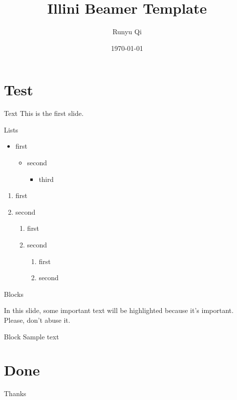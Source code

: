 \documentclass{beamer}
\title{Illini Beamer Template}
\author{Runyu Qi}
\institute{University of Illinois at Urbana-Champaign}
\date{\today}
\begin{document}
\begin{frame}
    \titlepage
\end{frame}

\begin{frame}
    \tableofcontents
\end{frame}

\section{Test}

\begin{frame}{Text}
    This is the first slide.
\end{frame}

\begin{frame}{Lists}
    \begin{itemize}
        \item first
        \begin{itemize}
            \item second
            \begin{itemize}
                \item third
            \end{itemize} 
        \end{itemize}
    \end{itemize}

    \begin{enumerate}
        \item first
        \item second
        \begin{enumerate}
            \item first
            \item second
            \begin{enumerate}
                \item first
                \item second
            \end{enumerate}
        \end{enumerate}
            
    \end{enumerate}
\end{frame}

\begin{frame}{Blocks}
    
    In this slide, some important text will be
    \alert{highlighted} because it's important.
    Please, don't abuse it.
    
    \begin{block}{Block}
    Sample text
    \end{block}

\end{frame}

\section{Done}
\begin{frame}
    \centering \Huge Thanks
\end{frame}
\end{document}
